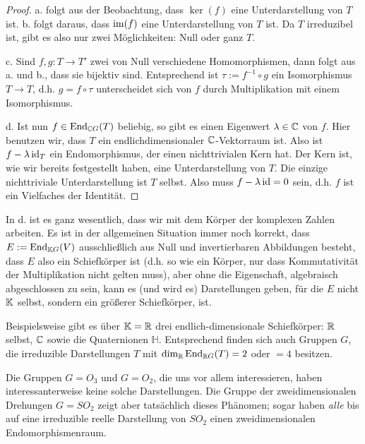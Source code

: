 \begin{proof}
a. folgt aus der Beobachtung, dass $\ker(f)$ eine Unterdarstellung von $T$ ist. b. folgt daraus, dass $\operatorname{im}(f)$ eine Unterdarstellung von $T$ ist. Da $T$ irreduzibel ist, gibt es also nur zwei Möglichkeiten: Null oder ganz $T$.

\smallbreak
c. Sind $f, g: T\to T'$ zwei von Null verschiedene Homomorphismen, dann folgt aus a. und b., dass sie bijektiv sind. Entsprechend ist $\tau:=f^{-1}\circ g$ ein Isomorphismus $T\to T$, d.h. $g=f\circ\tau$ unterscheidet sich von $f$ durch Multiplikation mit einem Isomorphismus.

\smallbreak
d. Ist nun $f\in\operatorname{End}_{\mathbb{C} G}(T)$ beliebig, so gibt es einen Eigenwert $\lambda\in\mathbb{C}$ von $f$. Hier benutzen wir, dass $T$ ein endlichdimensionaler $\mathbb{C}$-Vektorraum ist. Also ist $f-\lambda\operatorname{id}_T$ ein Endomorphismus, der einen nichttrivialen Kern hat. Der Kern ist, wie wir bereits festgestellt haben, eine Unterdarstellung von $T$. Die einzige nichttriviale Unterdarstellung ist $T$ selbst. Also muss $f-\lambda\operatorname{id} = 0$ sein, d.h. $f$ ist ein Vielfaches der Identität.
\end{proof}

\begin{remark}
In d. ist es ganz wesentlich, dass wir mit dem Körper der komplexen Zahlen arbeiten. Es ist in der allgemeinen Situation immer noch korrekt, dass $E:=\operatorname{End}_{\mathbb{K} G}(V)$ ausschließlich aus Null und invertierbaren Abbildungen besteht, dass $E$ also ein Schiefkörper ist (d.h. so wie ein Körper, nur dass Kommutativität der Multiplikation nicht gelten muss), aber ohne die Eigenschaft, algebraisch abgeschlossen zu sein, kann es (und wird es) Darstellungen geben, für die $E$ nicht $\mathbb{K}$ selbst, sondern ein größerer Schiefkörper, ist.

\medbreak
Beispielsweise gibt es über $\mathbb{K}=\mathbb{R}$ drei endlich-dimensionale Schiefkörper: $\mathbb{R}$ selbst, $\mathbb{C}$ sowie die Quaternionen $\mathbb{H}$. Entsprechend finden sich auch Gruppen $G$, die irreduzible Darstellungen $T$ mit $\dim_{\mathbb{R}} \operatorname{End}_{\mathbb{R} G}(T)=2$ oder $=4$ besitzen.

Die Gruppen $G=O_3$ und $G=O_2$, die uns vor allem interessieren, haben interessanterweise keine solche Darstellungen. Die Gruppe der zweidimensionalen Drehungen $G=SO_2$ zeigt aber tatsächlich dieses Phänomen; sogar haben \emph{alle} bis auf eine irreduzible reelle Darstellung von $SO_2$ einen zweidimensionalen Endomorphismenraum.
\end{remark}

